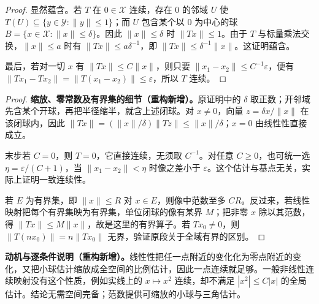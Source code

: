 \documentclass[../../main.tex]{subfiles}
\begin{document}
\begin{proof}
显然蕴含。若 $T$ 在 $0\in\mathcal X$ 连续，存在 $0$ 的邻域 $U$ 使 $T(U)\subseteq\{y\in\mathcal Y:\|y\|\le1\}$；而 $U$ 包含某个以 $0$ 为中心的球 $B=\{x\in\mathcal X:\|x\|\le\delta\}$。因此 $\|x\|\le\delta$ 时 $\|Tx\|\le1$。由于 $T$ 与标量乘法交换，$\|x\|\le a$ 时有 $\|Tx\|\le a\delta^{-1}$，即 $\|Tx\|\le\delta^{-1}\|x\|$。这证明蕴含。

最后，若对一切 $x$ 有 $\|Tx\|\le C\|x\|$，则只要 $\|x_1-x_2\|\le C^{-1}\varepsilon$，便有 $\|Tx_1-Tx_2\|=\|T(x_1-x_2)\|\le\varepsilon$，所以 $T$ 连续。
\end{proof}
\begin{proof}
\textbf{缩放、零常数及有界集的细节（重构新增）。}原证明中的 $\delta$ 取正数；开邻域先含某个开球，再把半径缩半，就含上述闭球。对 $x\ne0$，向量 $z=\delta x/\|x\|$ 在该闭球内，因此 $\|Tx\|=(\|x\|/\delta)\|Tz\|\le\|x\|/\delta$；$x=0$ 由线性性直接成立。

末步若 $C=0$，则 $T=0$，它直接连续，无须取 $C^{-1}$。对任意 $C\ge0$，也可统一选 $\eta=\varepsilon/(C+1)$，当 $\|x_1-x_2\|<\eta$ 时像之差小于 $\varepsilon$。这个估计与基点无关，实际上证明一致连续性。

若 $E$ 为有界集，即 $\|x\|\le R$ 对 $x\in E$，则像中范数至多 $CR$。反过来，若线性映射把每个有界集映为有界集，单位闭球的像有某界 $M$；把非零 $x$ 除以其范数，得 $\|Tx\|\le M\|x\|$，故是这里的有界算子。若 $Tx_0\ne0$，则 $\|T(nx_0)\|=n\|Tx_0\|$ 无界，验证原段关于全域有界的区别。
\end{proof}
\begin{remark}
\textbf{动机与逐条件说明（重构新增）。}线性性把任一点附近的变化化为零点附近的变化，又把小球估计缩放成全空间的比例估计，因此一点连续就足够。一般非线性连续映射没有这个性质，例如实线上的 $x\mapsto x^2$ 连续，却不满足 $|x^2|\le C|x|$ 的全局估计。结论无需空间完备；范数提供可缩放的小球与三角估计。
\end{remark}
\end{document}
